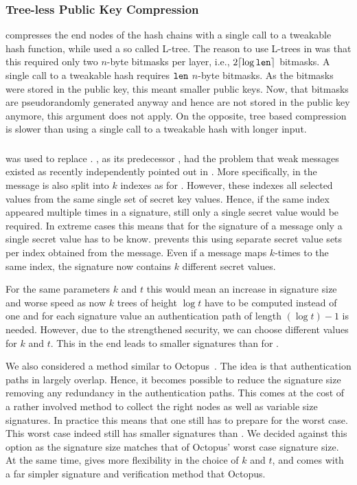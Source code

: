 \subsubsection{Tree-less \wotsp Public Key Compression}
\spx compresses the end nodes of the \wotsp hash chains with a single call
to a tweakable hash function, while \spc used a so called L-tree.
The reason to use L-trees in \spc was that this required only two
$n$-byte bitmasks per layer, i.e., $2\lceil\log \texttt{len}\rceil$ bitmasks. A single call
to a tweakable hash requires $\texttt{len}$ $n$-byte bitmasks.
As the bitmasks were stored in the public key, this meant
smaller public keys. Now, that bitmasks are pseudorandomly generated anyway and
hence are not stored in the public key anymore,
this argument does not apply. On the opposite, tree based compression
is slower than using a single call to a tweakable hash with longer input.

\subsubsection{\fors} \label{sec:changes:fors}
\fors was used to replace \horst. \horst, as its predecessor
\hors, had the problem that weak messages existed as recently independently
pointed out in \cite{Aumasson2017}. More specifically, in \horst the message
is also split into $k$ indexes as for \fors. However, these indexes all selected
values from the same single set of secret key values. Hence, if the same index
appeared multiple times in a signature, still only a single secret value would be
required. In extreme cases this means that for the signature of a message only
a single secret value has to be know. \fors prevents this using separate secret
value sets per index obtained from the message. Even if a message maps $k$-times
to the same index, the signature now contains $k$ different secret values.

For the same parameters $k$ and $t$ this would mean an increase in signature
size and worse speed as now $k$ trees of height $\log t$ have to be computed
instead of one and for each signature value an authentication path of length
$(\log t) -1$ is needed. However, due to the strengthened security, we can
choose different values for $k$ and $t$. This in the end leads to smaller
signatures than for \horst.

We also considered a method similar to Octopus~\cite{Aumasson2017a}. The idea
is that authentication paths in \horst largely overlap. Hence, it becomes
possible to reduce the signature size removing any redundancy in the
authentication paths. This comes at the cost of a rather involved method to
collect the right nodes as well as variable size signatures. In practice this
means that one still has to prepare for the worst case. This worst case
indeed still has smaller signatures than \horst. We decided against this option
as the \fors signature size matches that of Octopus' worst case signature size.
At the same time, \fors gives more flexibility in the choice of $k$ and $t$, and
comes with a far simpler signature and verification method that Octopus.

